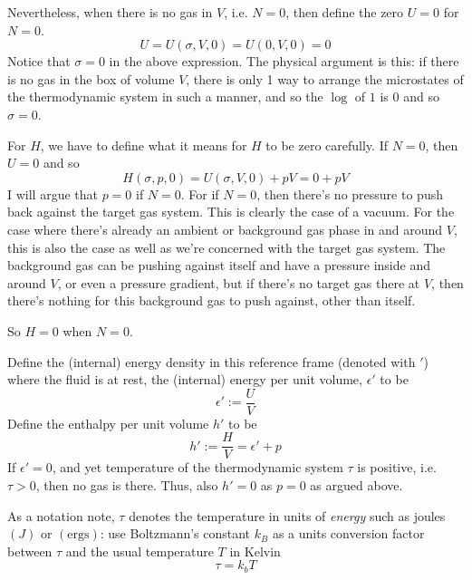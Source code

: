 \documentclass[10pt]{amsart}
\begin{document}
\begin{multicols*}{2}
Nevertheless, when there is no gas in $V$, i.e. $N=0$, then define the zero $U=0$ for $N=0$.
\[
U=U(\sigma,V,0) = U(0,V,0) = 0 
\]
Notice that $\sigma=0$ in the above expression.  The physical argument is this: if there is no gas in the box of volume $V$, there is only 1 way to arrange the microstates of the thermodynamic system in such a manner, and so the $\log$ of $1$ is $0$ and so $\sigma =0$.

For $H$, we have to define what it means for $H$ to be zero carefully.  If $N=0$, then $U=0$ and so
\[
H(\sigma,p,0)= U(\sigma,V,0) + pV = 0 + pV
\]
I will argue that $p=0$ if $N=0$.  For if $N=0$, then there's no pressure to push back against the target gas system.  This is clearly the case of a vacuum.  For the case where there's already an ambient or background gas phase in and around $V$, this is also the case as well as we're concerned with the target gas system.  The background gas can be pushing against itself and have a pressure inside and around $V$, or even a pressure gradient, but if there's no target gas there at $V$, then there's nothing for this background gas to push against, other than itself.

So $H=0$ when $N=0$.

Define the (internal) energy density in this reference frame (denoted with $'$) where the fluid is at rest, the (internal) energy per unit volume, $\epsilon'$ to be
\begin{equation}
  \epsilon' := \frac{U}{V}
  \end{equation}
Define the enthalpy per unit volume $h'$ to be
\begin{equation}
  h':= \frac{H}{V} = \epsilon' + p
\end{equation}
If $\epsilon'=0$, and yet temperature of the thermodynamic system $\tau$ is positive, i.e. $\tau  >0$, then no gas is there.  Thus, also $h'=0$ as $p=0$ as argued above.

As a notation note, $\tau$ denotes the temperature in units of \emph{energy} such as joules $(J)$ or $(\text{ergs})$: use Boltzmann's constant $k_B$ as a units conversion factor between $\tau$ and the usual temperature $T$ in Kelvin
\[
\tau = k_b T
\]


\end{multicols*}
\end{document}
